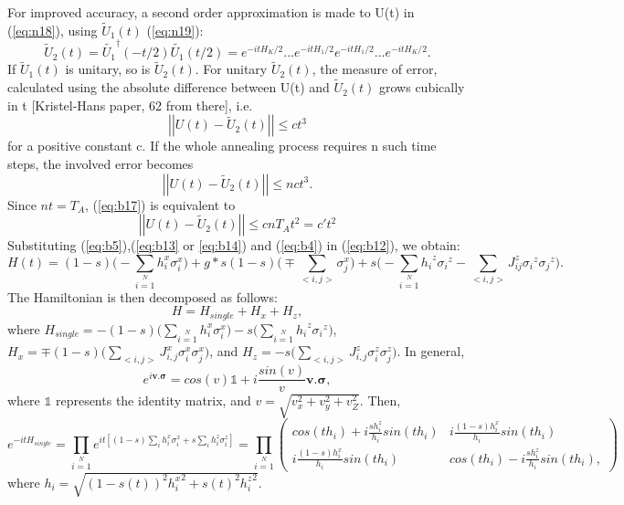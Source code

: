 \documentclass[12]{article}
\begin{document}
For improved accuracy, a second order approximation is made to U(t) in (\ref{eq:n18}), using $\tilde{U}_1(t)$ (\ref{eq:n19}):
\begin{equation}
\tilde{U}_2(t)=\tilde{U_1}^{\dagger}(-t/2)\tilde{U_1}(t/2)=e^{-itH_K/2}...e^{-itH_1/2}e^{-itH_1/2}...e^{-itH_K/2}.
\end{equation}
If $\tilde{U}_1(t)$ is unitary, so is $\tilde{U}_2(t)$. For unitary $\tilde{U}_2(t)$, the measure of error, calculated using the absolute difference between U(t) and $\tilde{U}_2(t)$ grows cubically in t [Kristel-Hans paper, 62 from there], i.e.
\begin{equation}
\left| \left| U(t)-\tilde{U}_2(t) \right| \right| \leq ct^3    
\end{equation} 
for a positive constant c. If the whole annealing process requires n such time steps, the involved error becomes
\begin{equation}
\left| \left| U(t)-\tilde{U}_2(t) \right| \right| \leq nct^3.  \label{eq:b17}
\end{equation}
Since $nt=T_A$, (\ref{eq:b17}) is equivalent to
\begin{equation}
\left| \left| U(t)-\tilde{U}_2(t) \right| \right| \leq cnT_At^2 = c't^2 \label{eq:b18}
\end{equation}
Substituting (\ref{eq:b5}),(\ref{eq:b13} or \ref{eq:b14}) and (\ref{eq:b4}) in (\ref{eq:b12}), we obtain:
\begin{equation}
H(t)=(1-s)\Big(-\sum \limits_{i=1}\limits^N h_i^x \sigma_i^x \Big)+g*s(1-s)\Big(\mp \sum \limits_{<i,j>}\sigma_{j}^x\Big) +s \Big(-\sum\limits_{i=1}\limits^{N}{h_i}^z{\sigma_i}^z - \sum\limits_{<i,j>}{J_{ij}^z} {\sigma_i}^z{\sigma_j}^z \Big).  \label{eq:b19}
\end{equation}
The Hamiltonian is then decomposed as follows:
\begin{equation}
H=H_{single}+H_x+H_z, \label{eq:b20}
\end{equation}
where $H_{single}=-(1-s)\Big(\sum \limits_{i=1}\limits^N h_i^x \sigma_i^x \Big)-s\Big(\sum\limits_{i=1}\limits^{N}{h_i}^z{\sigma_i}^z \Big)$, $H_x= \mp (1-s) \Big( \sum \limits_{<i,j>} J_{i,j}^x \sigma_{i}^x \sigma_{j}^x \Big)$, and $H_z= -s \Big(\sum \limits_{<i,j>} J_{i,j}^z \sigma_{i}^z\sigma_{j}^z\Big )$. In general, 
\begin{equation}
e^{i \mathbf{v.\sigma}}=cos(v) \mathbb{1} +i \frac{sin(v)}{v}\mathbf{v.\sigma},
\end{equation}
where $\mathbb{1}$ represents the identity matrix, and $v=\sqrt{v_x^2 +v_y^2 +v_Z^2}$. Then, 
\begin{equation}
e^{-itH_{single}}=\prod \limits_{i=1} \limits^{N} e^{it[(1-s)\sum \limits_i h_i^x \sigma_i^x +s \sum \limits_{i} h_i^z \sigma_i^z]} = \prod \limits_{i=1} \limits^{N} \begin{pmatrix}
cos(th_i) +i \frac{sh_i^z}{h_i} sin(th_i) &  i \frac{(1-s)h_i^x}{h_i} sin(th_i)\\
i \frac{(1-s)h_i^x}{h_i}sin(th_i) & cos(th_i) -i \frac{sh_i^z}{h_i} sin(th_i),
\end{pmatrix}
\end{equation}
where $h_i=\sqrt{(1-s(t))^2 {h_i^x}^2 + s(t)^2 {h_i^z}^2}$.\\
\end{document}
